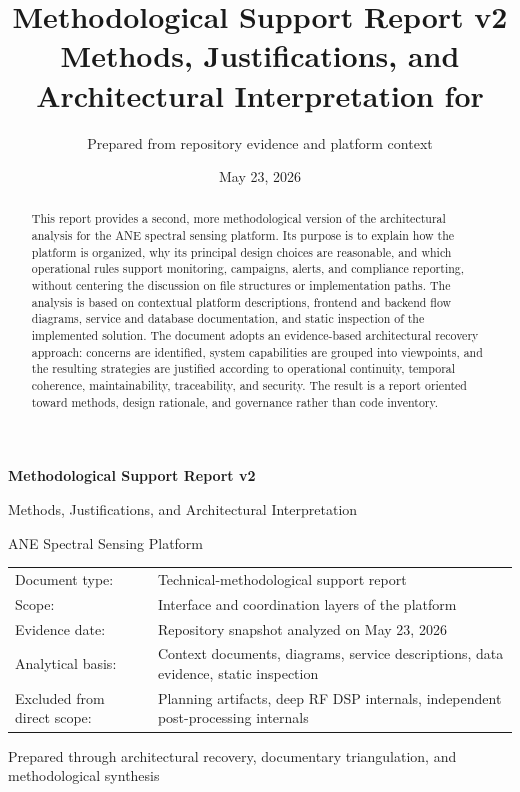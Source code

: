 \documentclass[11pt,a4paper]{article}
\title{
  \vspace{-2em}
  \textbf{Methodological Support Report v2}\\
  \large Methods, Justifications, and Architectural Interpretation for \project
}
\author{Prepared from repository evidence and platform context}
\date{May 23, 2026}
\newcommand{\project}{ANE Spectral Sensing Platform}
\begin{document}

\begin{titlepage}
  \centering
  \vspace*{3cm}
  {\LARGE \textbf{Methodological Support Report v2}\par}
  \vspace{0.6cm}
  {\Large Methods, Justifications, and Architectural Interpretation\par}
  \vspace{0.4cm}
  {\large \project\par}
  \vspace{2cm}
  \begin{tabular}{@{}p{}p{}@{}}
    Document type: & Technical-methodological support report \\
    Scope: & Interface and coordination layers of the platform \\
    Evidence date: & Repository snapshot analyzed on May 23, 2026 \\
    Analytical basis: & Context documents, diagrams, service descriptions, data evidence, static inspection \\
    Excluded from direct scope: & Planning artifacts, deep RF DSP internals, independent post-processing internals \\
  \end{tabular}
  \vfill
  {\large Prepared through architectural recovery, documentary triangulation, and methodological synthesis\par}
\end{titlepage}
\clearpage
{}

\begin{abstract}
This report provides a second, more methodological version of the architectural analysis for the ANE spectral sensing platform. Its purpose is to explain how the platform is organized, why its principal design choices are reasonable, and which operational rules support monitoring, campaigns, alerts, and compliance reporting, without centering the discussion on file structures or implementation paths. The analysis is based on contextual platform descriptions, frontend and backend flow diagrams, service and database documentation, and static inspection of the implemented solution. The document adopts an evidence-based architectural recovery approach: concerns are identified, system capabilities are grouped into viewpoints, and the resulting strategies are justified according to operational continuity, temporal coherence, maintainability, traceability, and security. The result is a report oriented toward methods, design rationale, and governance rather than code inventory.
\end{abstract}
\end{document}
